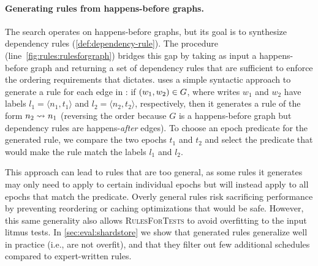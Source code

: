 \paragraph{Generating rules from happens-before graphs.}
The  search operates on happens-before graphs,
but its goal is to synthesize dependency rules (\cref{def:dependency-rule}).
The  procedure (line~\ref{fig:rules:rulesforgraph})
bridges this gap
by taking as input a happens-before graph \gr
and returning a set of dependency rules 
that are sufficient to enforce the ordering requirements that \gr dictates.
 uses a simple syntactic approach to generate a rule for each edge in \gr:
if $(w_1, w_2) \in G$,
where writes $w_1$ and $w_2$ have labels $l_1 = \langle n_1, t_1 \rangle$ and $l_2 = \langle n_2, t_2 \rangle$, respectively,
then it generates a rule of the form $n_2\rightsquigarrow_{}n_1$
(reversing the order because $G$ is a happens-before graph
but dependency rules are happens-\emph{after} edges).
To choose an epoch predicate for the generated rule,
we compare the two epochs $t_1$ and $t_2$
and select the predicate that would make the rule match the labels $l_1$ and $l_2$.\tighten

This approach can lead to rules that are too general,
as some rules it generates may only need to apply to certain individual epochs
but will instead apply to all epochs that match the predicate.
Overly general rules risk sacrificing performance
by preventing reordering or caching optimizations that would be safe.
However, this same generality also allows \textsc{RulesForTests} to avoid overfitting to the input litmus tests.
In \cref{sec:eval:shardstore} we show that generated rules generalize well in practice (i.e., are not overfit),
and that they filter out few additional schedules compared to expert-written rules.

